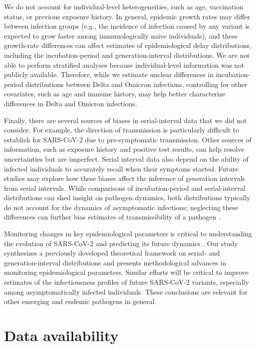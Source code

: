 \documentclass[12pt]{article}
\begin{document}
We do not account for individual-level heterogeneities, such as age, vaccination status, or previous exposure history.
In general, epidemic growth rates may differ between infection groups (e.g., the incidence of infection caused by any variant is expected to grow faster among immunologically naive individuals), and these growth-rate differences can affect estimates of epidemiological delay distributions, including the incubation-period and generation-interval distributions.
We are not able to perform stratified analyses because individual-level information was not publicly available.
Therefore, while we estimate unclear differences in incubation-period distributions between Delta and Omicron infections, controlling for other covariates, such as age and immune history, may help better characterize differences in Delta and Omicron infections.

Finally, there are several sources of biases in serial-interval data that we did not consider.
For example, the direction of transmission is particularly difficult to establish for SARS-CoV-2 due to pre-symptomatic transmission.
Other sources of information, such as exposure history and positive test results, can help resolve uncertainties but are imperfect.
Serial interval data also depend on the ability of infected individuals to accurately recall when their symptoms started.
Future studies may explore how these biases affect the inference of generation intervals from serial intervals.
While comparisons of incubation-period and serial-interval distributions can shed insight on pathogen dynamics, both distributions typically do not account for the dynamics of asymptomatic infections; neglecting these differences can further bias estimates of transmissibility of a pathogen \citep{park2020time}.

Monitoring changes in key epidemiological parameters is critical to understanding the evolution of SARS-CoV-2 and predicting its future dynamics \citep{kraemer2021monitoring}.
Our study synthesizes a previously developed theoretical framework on serial- and generation-interval distributions and presents methodological advances in monitoring epidemiological parameters.
Similar efforts will be critical to improve estimates of the infectiousness profiles of future SARS-CoV-2 variants, especially among asymptomatically infected individuals.
These conclusions are relevant for other emerging and endemic pathogens in general.

\section*{Data availability}
\end{document}
